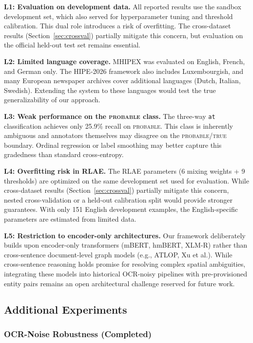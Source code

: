 \documentclass[11pt,a4paper]{article}
\begin{document}
\textbf{L1: Evaluation on development data.} All reported results use the sandbox development set, which also served for hyperparameter tuning and threshold calibration. This dual role introduces a risk of overfitting. The cross-dataset results (Section~\ref{sec:crossval}) partially mitigate this concern, but evaluation on the official held-out test set remains essential.

\textbf{L2: Limited language coverage.} MHIPEX was evaluated on English, French, and German only. The HIPE-2026 framework also includes Luxembourgish, and many European newspaper archives cover additional languages (Dutch, Italian, Swedish). Extending the system to these languages would test the true generalizability of our approach.

\textbf{L3: Weak performance on the \textsc{probable} class.} The three-way \texttt{at} classification achieves only 25.9\% recall on \textsc{probable}. This class is inherently ambiguous and annotators themselves may disagree on the \textsc{probable}/\textsc{true} boundary. Ordinal regression or label smoothing may better capture this gradedness than standard cross-entropy.

\textbf{L4: Overfitting risk in RLAE.} The RLAE parameters (6 mixing weights + 9 thresholds) are optimized on the same development set used for evaluation. While cross-dataset results (Section~\ref{sec:crossval}) partially mitigate this concern, nested cross-validation or a held-out calibration split would provide stronger guarantees. With only 151 English development examples, the English-specific parameters are estimated from limited data.

\textbf{L5: Restriction to encoder-only architectures.} Our framework deliberately builds upon encoder-only transformers (mBERT, hmBERT, XLM-R) rather than cross-sentence document-level graph models (e.g., ATLOP, Xu et al.). While cross-sentence reasoning holds promise for resolving complex spatial ambiguities, integrating these models into historical OCR-noisy pipelines with pre-provisioned entity pairs remains an open architectural challenge reserved for future work.

\subsection*{Additional Experiments}

\subsubsection*{OCR-Noise Robustness (Completed)}
\end{document}
